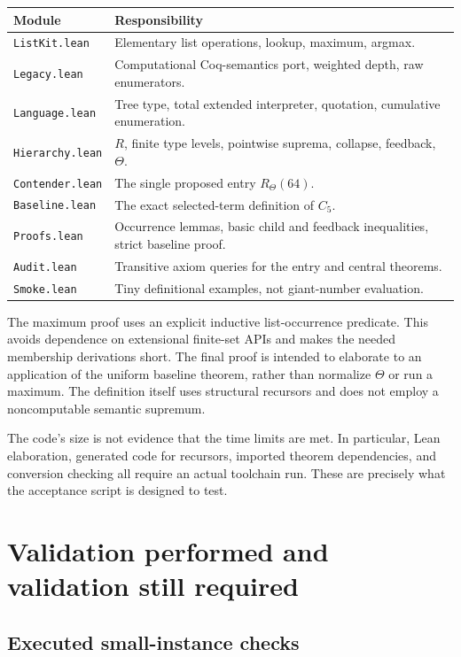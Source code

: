 \documentclass[11pt]{article}
\theoremstyle{definition}
\newcommand{\Cfive}{C_5}
\newcommand{\code}[1]{\texttt{#1}}
\begin{document}
\begin{center}
\begin{tabular}{p{.23\linewidth}p{.69\linewidth}}
\toprule
Module & Responsibility\\
\midrule
\code{ListKit.lean} & Elementary list operations, lookup, maximum, argmax.\\
\code{Legacy.lean} & Computational Coq-semantics port, weighted depth, raw enumerators.\\
\code{Language.lean} & Tree type, total extended interpreter, quotation, cumulative enumeration.\\
\code{Hierarchy.lean} & $R$, finite type levels, pointwise suprema, collapse, feedback, $\Theta$.\\
\code{Contender.lean} & The single proposed entry $R_\Theta(64)$.\\
\code{Baseline.lean} & The exact selected-term definition of $\Cfive$.\\
\code{Proofs.lean} & Occurrence lemmas, basic child and feedback inequalities, strict baseline proof.\\
\code{Audit.lean} & Transitive axiom queries for the entry and central theorems.\\
\code{Smoke.lean} & Tiny definitional examples, not giant-number evaluation.\\
\bottomrule
\end{tabular}
\end{center}

The maximum proof uses an explicit inductive list-occurrence predicate.
This avoids dependence on extensional finite-set APIs and makes the needed
membership derivations short. The final proof is intended to elaborate to
an application of the uniform baseline theorem, rather than normalize
$\Theta$ or run a maximum. The definition itself uses structural recursors
and does not employ a noncomputable semantic supremum.

The code's size is not evidence that the time limits are met. In particular,
Lean elaboration, generated code for recursors, imported theorem dependencies,
and conversion checking all require an actual toolchain run. These are
precisely what the acceptance script is designed to test.

\section{Validation performed and validation still required}
\label{sec:validation}

\subsection{Executed small-instance checks}
\end{document}
